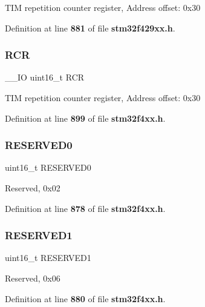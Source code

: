 T\+IM repetition counter register, Address offset\+: 0x30 

Definition at line \textbf{ 881} of file \textbf{ stm32f429xx.\+h}.

\mbox{\label{structTIM__TypeDef_aa0663aab6ed640b7594c8c6d32f6c1cd}} 
\subsubsection{R\+CR\hspace{0.1cm}{\footnotesize\ttfamily [2/2]}}
{\footnotesize\ttfamily \+\_\+\+\_\+\+IO uint16\+\_\+t R\+CR}

T\+IM repetition counter register, Address offset\+: 0x30 

Definition at line \textbf{ 899} of file \textbf{ stm32f4xx.\+h}.

\mbox{\label{structTIM__TypeDef_a149feba01f9c4a49570c6d88619f504f}} 
\subsubsection{R\+E\+S\+E\+R\+V\+E\+D0}
{\footnotesize\ttfamily uint16\+\_\+t R\+E\+S\+E\+R\+V\+E\+D0}

Reserved, 0x02 

Definition at line \textbf{ 878} of file \textbf{ stm32f4xx.\+h}.

\mbox{\label{structTIM__TypeDef_a8249a3955aace28d92109b391311eb30}} 
\subsubsection{R\+E\+S\+E\+R\+V\+E\+D1}
{\footnotesize\ttfamily uint16\+\_\+t R\+E\+S\+E\+R\+V\+E\+D1}

Reserved, 0x06 

Definition at line \textbf{ 880} of file \textbf{ stm32f4xx.\+h}.

\mbox{\label{structTIM__TypeDef_ad68efe7a323ac2fcb823a26c0c51445b}} 

